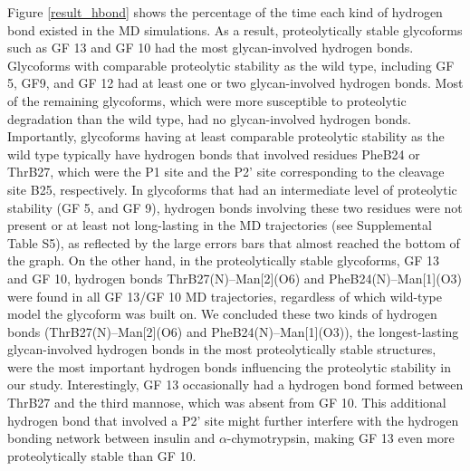 \documentclass[9pt]{elife}
\begin{document}
Figure \ref{result_hbond} shows the percentage of the time each kind of hydrogen bond existed in the MD simulations. As a result, proteolytically stable glycoforms such as GF 13 and GF 10 had the most glycan-involved hydrogen bonds. Glycoforms with comparable proteolytic stability as the wild type, including GF 5, GF9, and GF 12 had at least one or two glycan-involved hydrogen bonds. Most of the remaining glycoforms, which were more susceptible to proteolytic degradation than the wild type, had no glycan-involved hydrogen bonds. Importantly, glycoforms having at least comparable proteolytic stability as the wild type typically have hydrogen bonds that involved residues PheB24 or ThrB27, which were the P1 site and the P2' site corresponding to the cleavage site B25, respectively. In glycoforms that had an intermediate level of proteolytic stability (GF 5, and GF 9), hydrogen bonds involving these two residues were not present or at least not long-lasting in the MD trajectories (see Supplemental Table S5), as reflected by the large errors bars that almost reached the bottom of the graph. On the other hand, in the proteolytically stable glycoforms, GF 13 and GF 10, hydrogen bonds ThrB27(N)--Man[2](O6) and PheB24(N)--Man[1](O3) were found in all GF 13/GF 10 MD trajectories, regardless of which wild-type model the glycoform was built on. We concluded these two kinds of hydrogen bonds (ThrB27(N)--Man[2](O6) and PheB24(N)--Man[1](O3)), the longest-lasting glycan-involved hydrogen bonds in the most proteolytically stable structures, were the most important hydrogen bonds influencing the proteolytic stability in our study. Interestingly, GF 13 occasionally had a hydrogen bond formed between ThrB27 and the third mannose, which was absent from GF 10. This additional hydrogen bond that involved a P2' site might further interfere with the hydrogen bonding network between insulin and $\alpha$-chymotrypsin, making GF 13 even more proteolytically stable than GF 10. 
\end{document}
